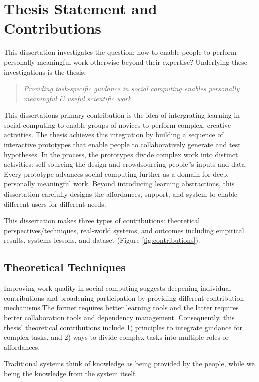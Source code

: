 \section{Thesis Statement and Contributions}
\noindent This dissertation investigates the question: how to enable people to perform personally meaningful work otherwise beyond their expertise? Underlying these investigations is the thesis:
\begin{quote}
\emph{Providing task-specific guidance in social computing enables personally meaningful \& useful scientific work}
\end{quote}

This dissertation\textquotesingle s primary contribution is the idea of intergrating learning in social computing to enable groups of novices to perform complex, creative activities. The thesis achieves this integration by building a sequence of interactive prototypes that enable people to collaboratively generate and test hypotheses. In the process, the prototypes divide complex work into distinct activities: self-sourcing the design and crowdsourcing people''s inputs and data. Every prototype advances social computing further as a domain for deep, personally meaningful work. Beyond introducing learning abstractions, this dissertation carefully designs the affordances, support, and system to enable different users for different needs. 

This dissertation makes three types of contributions: theoretical perspectives/techniques, real-world systems, and outcomes including empirical results, systems lessons, and dataset (Figure \ref{fig:contributions}). 

\subsection{Theoretical  Techniques}
Improving  work quality in social computing suggests deepening individual contributions and broadening participation by providing different contribution mechanisms.The former requires better learning tools and the latter requires better collaboration tools and dependency management. Consequently, this thesis' theoretical contributions include 1) principles to integrate guidance for complex tasks, and 2) ways to divide complex tasks into multiple roles or affordances.


Traditional systems think of knowledge as being provided by the people, while we being the knowledge from the system itself.

